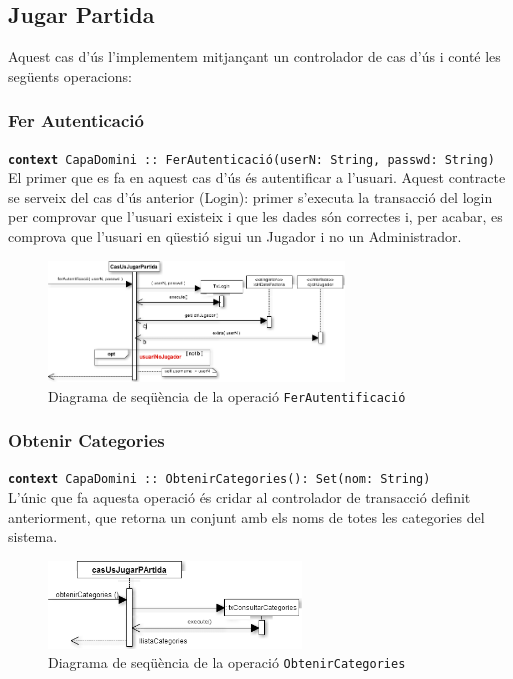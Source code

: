 \subsection{Jugar Partida}
Aquest cas d'ús l'implementem mitjançant un controlador de cas d'ús i conté les següents operacions:


\subsubsection{Fer Autenticació}
\texttt{\textbf{context} CapaDomini :: FerAutenticació(userN: String, passwd: String)}\\
El primer que es fa en aquest cas d'ús és autentificar a l'usuari. Aquest contracte se serveix del cas d'ús anterior (Login): primer s'executa la transacció del login per comprovar que l'usuari existeix i que les dades són correctes i, per acabar, es comprova que l'usuari en qüestió sigui un Jugador i no un Administrador.\\

    \begin{figure}[h]
    \centering
    \includegraphics[width=0.7\textwidth]{figures/ferAutentificacio.png}
    \caption{Diagrama de seqüència de la operació \texttt{FerAutentificació}}
    \end{figure}

\subsubsection{Obtenir Categories}
\texttt{\textbf{context} CapaDomini :: ObtenirCategories(): Set(nom: String)}\\
L'únic que fa aquesta operació és cridar al controlador de transacció definit anteriorment, que retorna un conjunt amb els noms de totes les categories del sistema.\\

    \begin{figure}[h]
    \centering
    \includegraphics[width=0.6\textwidth]{figures/obtenirCategories.png}
    \caption{Diagrama de seqüència de la operació \texttt{ObtenirCategories}}
    \end{figure}


